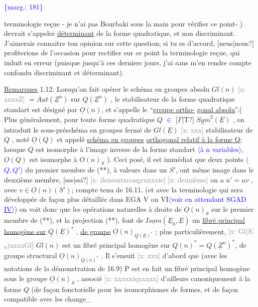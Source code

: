 \documentclass[11pt]{article}
\newcommand{\scanpage}[1]{\par\bigskip\noindent{\small\sffamily[scan #1]}\par}
\newcommand{\mspage}[1]{{\small\sffamily[p.\,#1]}}
\newcommand{\hand}[1]{\textcolor{blue}{#1}}
\let\over\relax
\newcommand{\over}[2]{\textcolor{gray}{#1}\textcolor{blue}{\ensuremath{^{\!\nearrow}}#2}}
\newcommand{\inserted}[2][]{\textcolor{blue}{$\langle$#2$\rangle$}}
\newcommand{\margin}[1]{\textcolor{blue}{\{\textsf{marg.:} #1\}}}
\newcommand{\xout}[1]{\textcolor{gray}{[\textsf{x:} #1]}}
\newcommand{\uline}[1]{\underline{#1}}
\newcommand{\unsure}[1]{[#1?]}
\begin{document}
\margin{181}

\clearpage
\scanpage{25/182}
\mspage{\hand{9}}

terminologie reçue  - je n'ai pas Bourbaki sous la main pour vérifier ce
point- ) devrait s'appeler \uline{déterminant} de la forme quadratique, et non
discriminant. J'aimerais connaitre ton opinion sur cette question; si
tu es d'accord, \unsure{neus|nous} profiterions de l'occasion pour rectifier sur ce
point la terminologie reçue, qui induit en erreur (puisque jusqu'à ces
derniers jours, j'ai sans m'en rendre compte confondu discriminant et
déterminant).

\uline{Remarques} 1\over{\unsure{5}}{6}.12. Lorsqu'on fait opérer le schéma en groupes absolu
$Gl(n)$ \xout{xxxxZ} $= \underline{Aut}(\underline{Z}^n )$ sur $\underline{Q}(\underline{Z}^n)$ , le stabilisateur de la forme
quadratique standart est désigné par $\underline{O}(n)$, et s'appelle le ``\uline{groupe ortho-}%
\uline{gonal absolu}''.( Plus généralement, pour toute forme quadratique $Q$ \hand{$\in$}
\unsure{$\Gamma$|T} $\underline{Sym}^2(\underline{E})$ , on introduit le sous-préschéma en groupes fermé de
$Gl(\underline{E})$ \xout{xxx} stabilisateur de $Q$ , noté $\underline{O}(Q)$ et appelé \uline{schéma en groupes}
\uline{orthogonal relatif à la forme Q}; lorsque $Q$ est isomorphe à l'image
inverse de la forme standart \inserted[typed]{à n variables}\hand{,} $\underline{O}(Q)$ est isomorphe à $O(n)_S$ ). Ceci posé,
il est immédiat que deux points \inserted{$Q,Q'$} du premier membre de (**), à valeurs dans
un $S'$, ont même image dans le deuxième membre, \unsure{sss|ssi} \xout{ilsxsontxcongruxxxie}
\xout{deuxième} on a $u' = uv$ , avec $v \in \underline{O}(n)(S')$; compte tenu de 16.11. (et
avec la terminologie qui sera développée de façon plus détaillée dans
EGA V ou VI\inserted{voir en attendant SGAD \uline{IV}}) on voit donc que les opérations naturelles à droite de
$\underline{O}(n)_S$ sur le premier membre de (**), et la projection (**), font de
$\underline{Isom}(\underline{E}_0,\underline{E})$ un \uline{fibré principal homogène sur} $\underline{Q}(\underline{E})^*$ , \uline{de groupe} $\underline{O}(n)_{\underline{Q}(\underline{E})^*}$ ;
plus particulièrement, \xout{Gl(E$_0$)xxxxGl} $Gl(n)$ est un fibré principal
homogène sur $\underline{Q}(n)^* = \underline{Q}(\underline{Z}^n)^*$, de groupe structural $\underline{O}(n)_{\underline{Q}(n)^*}$ . Il
s'ensuit \xout{xxx} d'abord que (avec les notations de la démonstration de 16.9)
P est en fait un fibré principal homogène sous le groupe $\underline{O}(n)_S$ , associé
\xout{xxxxxiqxxxxx} d'ailleurs canoniquement à la forme $Q$ (de façon fonctorielle
pour les isomorphismes de formes, et de façon compatible avec les change\_%
\end{document}
